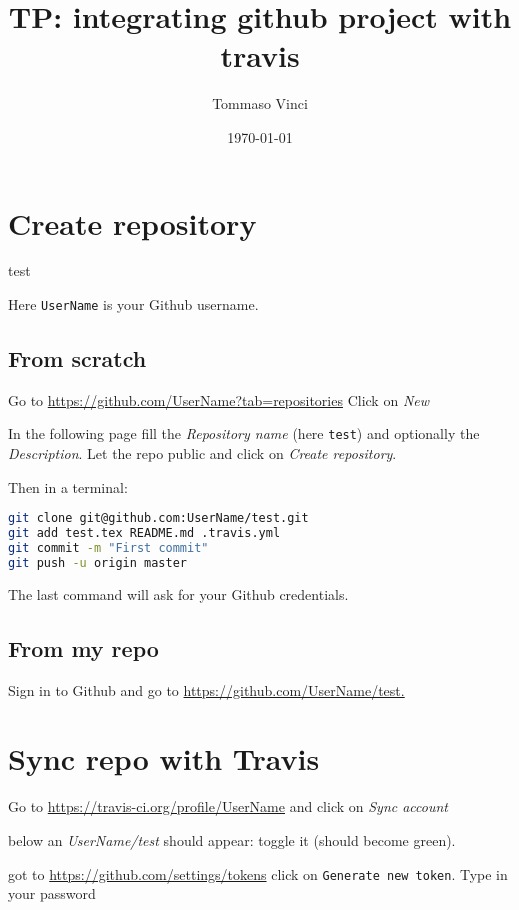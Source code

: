 \documentclass[12pt]{article}
\begin{document}
\title{TP: integrating github project with travis}
\author{Tommaso Vinci}
\date{\today}
\maketitle


\section*{Create repository}

test 

Here \texttt{UserName} is your Github username.

\subsection*{From scratch}

Go to \url{https://github.com/UserName?tab=repositories} Click on \emph{New}

In the following page fill the \emph{Repository name} (here \texttt{test}) and optionally the \emph{Description}. Let the repo public and click on \emph{Create repository}.

Then in a terminal:

\begin{lstlisting}[language=Bash] 
git clone git@github.com:UserName/test.git
git add test.tex README.md .travis.yml
git commit -m "First commit"
git push -u origin master
\end{lstlisting}

The last command will ask for your Github credentials.

\subsection*{From my repo}
Sign in to Github and go to \url{https://github.com/UserName/test.}




\section*{Sync repo with Travis}

Go to \url{https://travis-ci.org/profile/UserName} and click on \emph{Sync account}

below an \emph{UserName/test} should appear: toggle it (should become green).

got to \url{https://github.com/settings/tokens} click on \texttt{Generate new token}. Type in your password
\end{document}
